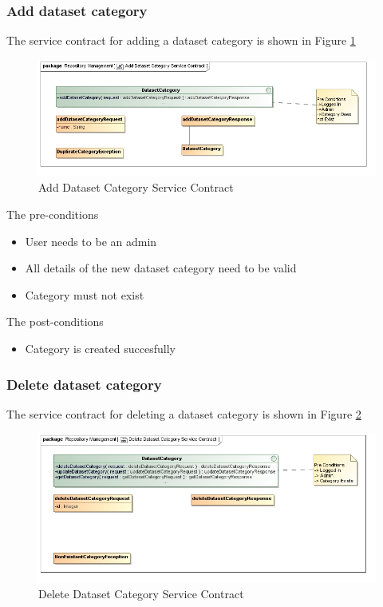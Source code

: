 \subsubsection {Add dataset category}
The service contract for adding a dataset category is shown in Figure \ref{fig:addDatasetCatService}
\begin{figure}[H]
  \begin{center}
  \includegraphics[scale=0.6]{../Diagrams and Charts/Test Data/Add Dataset Category Service Contract.jpg}
  \caption{Add Dataset Category Service Contract}
  \label{fig:addDatasetCatService}
  \end{center}
  
\end{figure}

The pre-conditions
\begin{itemize}
  \item User needs to be an admin
  \item All details of the new dataset category need to be valid
  \item Category must not exist
\end{itemize}

The post-conditions
\begin{itemize}
  \item Category is created succesfully
\end{itemize}

\subsubsection {Delete dataset category}

The service contract for deleting a dataset category is shown in Figure \ref{fig:deleteDatasetCatService}
\begin{figure}[H]
  \begin{center}
  \includegraphics[scale=0.6]{../Diagrams and Charts/Test Data/Delete Dataset Category Service Contract.jpg}
  \caption{Delete Dataset Category Service Contract}
  \label{fig:deleteDatasetCatService}
  \end{center}
  
\end{figure}

